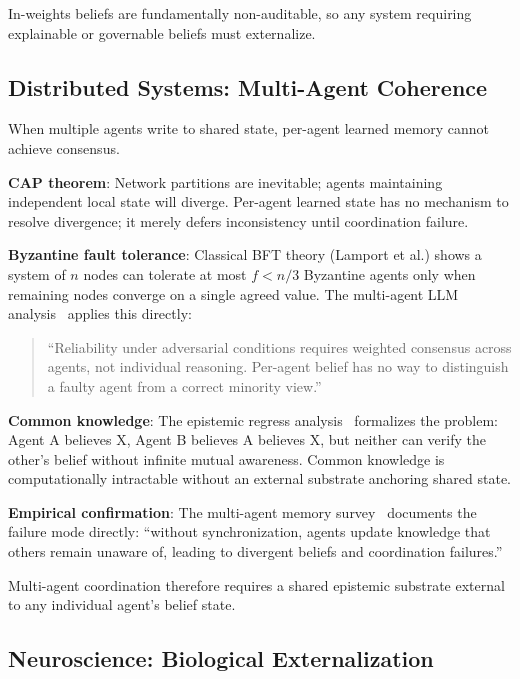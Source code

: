 \documentclass[11pt,letterpaper]{article}
\begin{document}
In-weights beliefs are fundamentally non-auditable, so any system requiring explainable or governable beliefs must externalize.

\subsection{Distributed Systems: Multi-Agent Coherence}

When multiple agents write to shared state, per-agent learned memory cannot achieve consensus.

\textbf{CAP theorem}: Network partitions are inevitable; agents maintaining independent local state will diverge. Per-agent learned state has no mechanism to resolve divergence; it merely defers inconsistency until coordination failure.

\textbf{Byzantine fault tolerance}: Classical BFT theory (Lamport et al.) shows a system of $n$ nodes can tolerate at most $f < n/3$ Byzantine agents only when remaining nodes converge on a single agreed value. The multi-agent LLM analysis~\cite{bft2025} applies this directly:

\begin{quote}
``Reliability under adversarial conditions requires weighted consensus across agents, not individual reasoning. Per-agent belief has no way to distinguish a faulty agent from a correct minority view.''
\end{quote}

\textbf{Common knowledge}: The epistemic regress analysis~\cite{commonknowledge2024} formalizes the problem: Agent A believes X, Agent B believes A believes X, but neither can verify the other's belief without infinite mutual awareness. Common knowledge is computationally intractable without an external substrate anchoring shared state.

\textbf{Empirical confirmation}: The multi-agent memory survey~\cite{masurvey2025} documents the failure mode directly: ``without synchronization, agents update knowledge that others remain unaware of, leading to divergent beliefs and coordination failures.''

Multi-agent coordination therefore requires a shared epistemic substrate external to any individual agent's belief state.

\subsection{Neuroscience: Biological Externalization}
\end{document}
